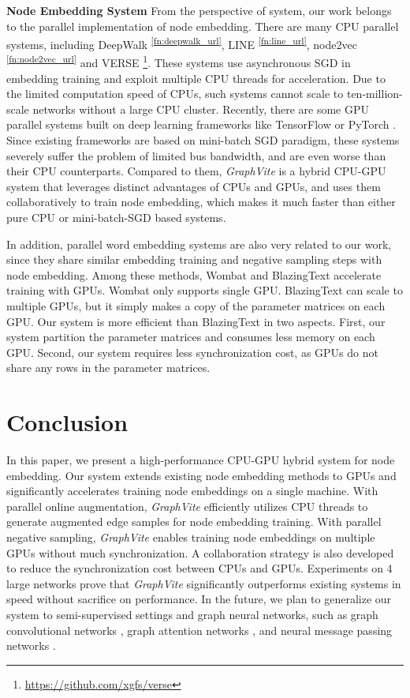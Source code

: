 \documentclass[sigconf]{acmart}
\newcommand{\Graphy}{\textit{GraphVite}\xspace}
\begin{document}
\medskip \noindent \textbf{Node Embedding System}
From the perspective of system, our work belongs to the parallel implementation of node embedding. There are many CPU parallel systems, including DeepWalk \textsuperscript{\ref{fn:deepwalk_url}}, LINE \textsuperscript{\ref{fn:line_url}}, node2vec \textsuperscript{\ref{fn:node2vec_url}} and VERSE \footnote{\url{https://github.com/xgfs/verse}}. These systems use asynchronous SGD \cite{recht2011hogwild} in embedding training and exploit multiple CPU threads for acceleration. Due to the limited computation speed of CPUs, such systems cannot scale to ten-million-scale networks without a large CPU cluster. Recently, there are some GPU parallel systems \cite{thunlp2017openne} built on deep learning frameworks like TensorFlow \cite{abadi2016tensorflow} or PyTorch \cite{paszke2017automatic}. Since existing frameworks are based on mini-batch SGD paradigm, these systems severely suffer the problem of limited bus bandwidth, and are even worse than their CPU counterparts. Compared to them, \Graphy is a hybrid CPU-GPU system that leverages distinct advantages of CPUs and GPUs, and uses them collaboratively to train node embedding, which makes it much faster than either pure CPU or mini-batch-SGD based systems.

In addition, parallel word embedding systems \cite{mikolov2013distributed, ji2016parallelizing, simonton2017efficient, gupta2017blazingtext} are also very related to our work, since they share similar embedding training and negative sampling steps with node embedding. Among these methods, Wombat \cite{simonton2017efficient} and BlazingText \cite{gupta2017blazingtext} accelerate training with GPUs. Wombat only supports single GPU. BlazingText can scale to multiple GPUs, but it simply makes a copy of the parameter matrices on each GPU. Our system is more efficient than BlazingText in two aspects. First, our system partition the parameter matrices and consumes less memory on each GPU. Second, our system requires less synchronization cost, as GPUs do not share any rows in the parameter matrices. \section{Conclusion}
\label{sec:conclusion}

In this paper, we present a high-performance CPU-GPU hybrid system for node embedding. Our system extends existing node embedding methods to GPUs and significantly accelerates training node embeddings on a single machine. With parallel online augmentation, \Graphy efficiently utilizes CPU threads to generate augmented edge samples for node embedding training. With parallel negative sampling, \Graphy enables training node embeddings on multiple GPUs without much synchronization. A collaboration strategy is also developed to reduce the synchronization cost between CPUs and GPUs. Experiments on 4 large networks prove that \Graphy significantly outperforms existing systems in speed without sacrifice on performance. In the future, we plan to generalize our system to semi-supervised settings and graph neural networks, such as graph convolutional networks \cite{kipf2016semi}, graph attention networks \cite{velickovic2017graph}, and neural message passing networks \cite{gilmer2017neural}.
\end{document}

